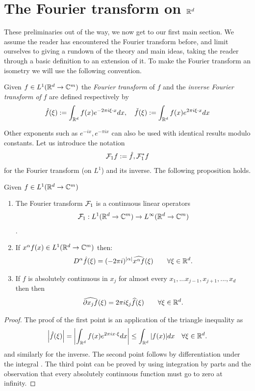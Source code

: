 \documentclass[
    a4paper,
    DIV=14,
    abstract=true,
    numbers=noenddot
]{scrartcl}
\begin{document}
\section{The Fourier transform on $\mathbb{R}^d$}
These preliminaries out of the way, we now get to our first main section. We assume the reader has encountered the Fourier transform before, and limit ourselves to giving a rundown of the theory and main ideas, taking the reader through a basic definition to an extension of it. To make the Fourier transform an isometry we will use the following convention.
\begin{definition}
	Given $f\in L^1(\mathbb{R}^d\to\mathbb{C}^m)$ the \emph{Fourier transform} of $f$ and the \emph{inverse Fourier transform of} $f$ are defined respectively by
	\[\hat{f}(\xi):=\int_{\mathbb{R}^d}f(x)e^{-2\pi i\xi\cdot  x} dx, \quad \check{f}(\xi):=\int_{\mathbb{R}^d}f(x)e^{2\pi i\xi\cdot  x} dx \]
\end{definition}
Other exponents such as $e^{-ix}, e^{-\pi i x}$ can also be used with identical results modulo constants. Let us introduce the notation $$\mathcal{F}_1 f:=\hat{f}, \mathcal{F}_1^*f$$ for the Fourier transform (on $L^1$) and its inverse.  The following proposition holds.
\begin{proposition}[Properties of $\Ff_1$]\label{regularitydecayft}
	Given $f\in L^1(\mathbb{R}^d\to\mathbb{C}^m)$
	\begin{enumerate}
		\item The Fourier transform   $\Ff_1$ is a continuous linear operators $$\mathcal{F}_1:L^1(\mathbb{R}^d\to\mathbb{C}^m) \to L^\infty(\mathbb{R}^d\to\mathbb{C}^m)$$\label{p1}.
		\item If $x^\alpha f(x)\in L^1(\mathbb{R}^d\to\mathbb{C}^m)$ then:\quad \[D^\alpha \hat{f}(\xi)=(-2\pi i)^{\left| \alpha \right|}\widehat{x^{\alpha} f}(\xi)\qquad\forall \xi\in\mathbb{R}^d.\]
		\item If $f$ is absolutely continuous in $x_j$ for almost every $x_1,...x_{j-1},x_{j+1},...,x_d$ then
		      then
		      \[\widehat{\partial x_j f}(\xi)=2\pi i\xi_j\widehat{ f}(\xi)\qquad\forall \xi\in\mathbb{R}^d.\]
	\end{enumerate}
\end{proposition}
\begin{proof}
	The proof of the first point is an application of the triangle inequality as
	\begin{equation*}
		{\left| \hat{f}(\xi ) \right|}={\left| \int_{\mathbb{R}^d}f(x)e^{2\pi i x\cdot \xi } dx \right|}\leq\int_{\mathbb{R}^d}{\left| f(x) \right|}dx\quad\forall \xi \in \mathbb{R}^d.
	\end{equation*}
	and similarly for the inverse. The second point follows by differentiation under the integral . The third point can be proved by using integration by parts and the observation that every absolutely continuous function must go to zero at infinity.
\end{proof}
\end{document}
